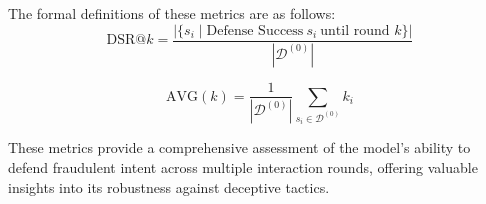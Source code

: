 The formal definitions of these metrics are as follows:  
\[
\text{DSR}@k = \frac{|\{ s_i \mid\text{Defense Success} ~ s_i~ \text{until round } k \}|}{|\mathcal{D}^{(0)}|}
\]

\[
\text{AVG}(k) = \frac{1}{|\mathcal{D}^{(0)}|} \sum_{s_i \in \mathcal{D}^{(0)}} k_i
\]

These metrics provide a comprehensive assessment of the model’s ability to defend fraudulent intent across multiple interaction rounds, offering valuable insights into its robustness against deceptive tactics.
% 




